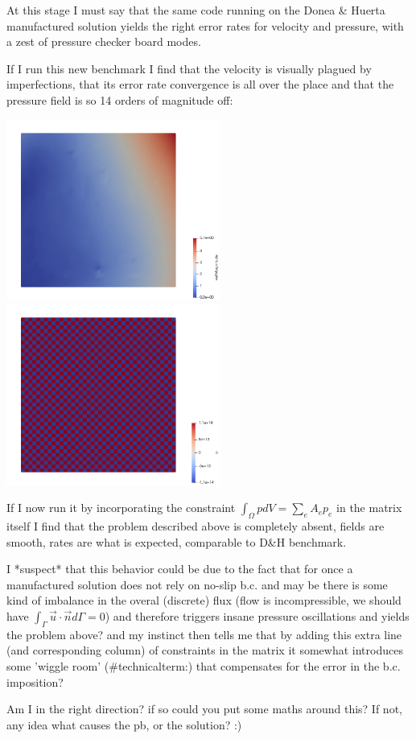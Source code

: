 \documentclass[a4paper,12pt]{article}
\begin{document}
At this stage I must say that the same code running on the Donea \& Huerta manufactured
solution yields the right error rates for velocity and pressure, with a zest of pressure 
checker board modes.

If I run this new benchmark I find that the velocity is visually plagued by imperfections, 
that its error rate convergence is all over the place and that the pressure field 
is so 14 orders of magnitude off:

\begin{center}
\includegraphics[width=7cm]{../results/exp09/velpb.png}
\includegraphics[width=7cm]{../results/exp09/presspb.png}
\end{center}

If I now run it by incorporating the constraint $\int_\Omega p dV = \sum_e A_e p_e$ in the 
matrix itself I find that the problem described above is completely absent, fields are smooth, 
rates are what is expected, comparable to D\&H benchmark. 

I *suspect* that this behavior could be due to the fact that for once a manufactured solution 
does not rely on no-slip b.c. and may be there is some kind of imbalance in the overal (discrete)
flux (flow is incompressible, we should have $\int_\Gamma \vec{u}\cdot\vec{n}d\Gamma=0$) 
and therefore triggers insane pressure oscillations and 
yields the problem above? and my instinct then tells me that 
by adding this extra line (and corresponding column) of constraints in the matrix it somewhat 
introduces some 'wiggle room' (\#technicalterm:) that compensates for the error in the b.c. imposition?
 
Am I in the right direction? if so could you put some maths around this? 
If not, any idea what causes the pb, or the solution? :)
 
\end{document}

